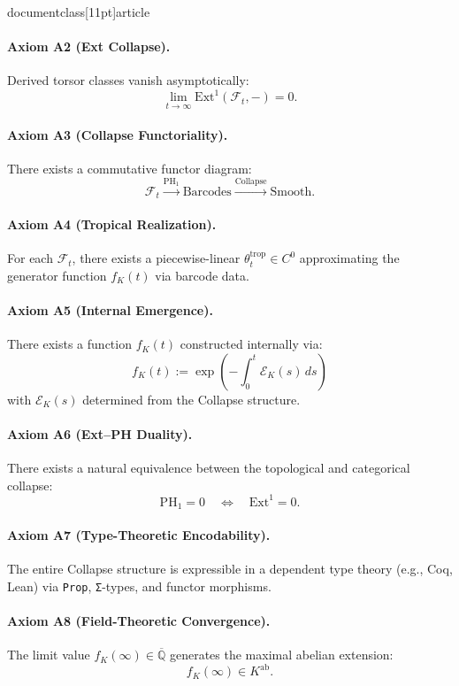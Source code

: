 \\documentclass[11pt]{article}
\begin{document}
\paragraph{Axiom A2 (Ext Collapse).}  
Derived torsor classes vanish asymptotically:
\[
\lim_{t \to \infty} \mathrm{Ext}^1(\mathcal{F}_t, -) = 0.
\]

\paragraph{Axiom A3 (Collapse Functoriality).}  
There exists a commutative functor diagram:
\[
\mathcal{F}_t \xrightarrow{\mathrm{PH}_1} \text{Barcodes} \xrightarrow{\text{Collapse}} \text{Smooth}.
\]

\paragraph{Axiom A4 (Tropical Realization).}  
For each \( \mathcal{F}_t \), there exists a piecewise-linear \( \theta_t^{\mathrm{trop}} \in C^0 \)  
approximating the generator function \( f_K(t) \) via barcode data.

\paragraph{Axiom A5 (Internal Emergence).}  
There exists a function \( f_K(t) \) constructed internally via:
\[
f_K(t) := \exp\left( - \int_0^t \mathcal{E}_K(s)\, ds \right)
\]
with \( \mathcal{E}_K(s) \) determined from the Collapse structure.

\paragraph{Axiom A6 (Ext–PH Duality).}  
There exists a natural equivalence between the topological and categorical collapse:
\[
\mathrm{PH}_1 = 0 \quad \Longleftrightarrow \quad \mathrm{Ext}^1 = 0.
\]

\paragraph{Axiom A7 (Type-Theoretic Encodability).}  
The entire Collapse structure is expressible in a dependent type theory  
(e.g., Coq, Lean) via \texttt{Prop}, \texttt{Σ}-types, and functor morphisms.

\paragraph{Axiom A8 (Field-Theoretic Convergence).}  
The limit value \( f_K(\infty) \in \overline{\mathbb{Q}} \) generates the maximal abelian extension:
\[
f_K(\infty) \in K^{\mathrm{ab}}.
\]
\end{document}
